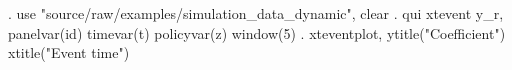 . use "source/raw/examples/simulation_data_dynamic", clear
{\smallskip}
. qui xtevent y_r, panelvar(id) timevar(t) policyvar(z) window(5)
{\smallskip}
. xteventplot, ytitle("Coefficient") xtitle("Event time")

